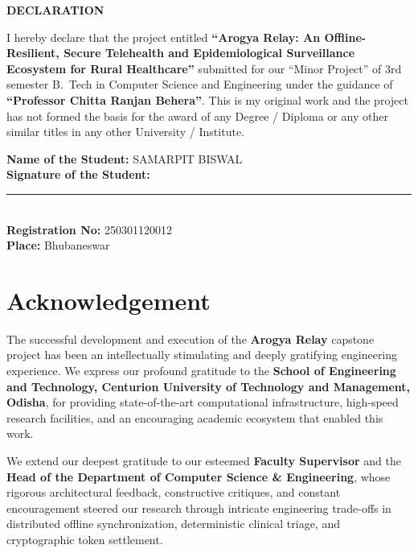 \documentclass[12pt,a4paper,oneside]{report}
\begin{document}
\clearpage

\thispagestyle{plain}

\begin{center}
    {\fontsize{16}{20}\selectfont \bfseries DECLARATION}
\end{center}
\vspace{1.0cm}

{\fontsize{13}{20}\selectfont
\noindent I hereby declare that the project entitled \textbf{``Arogya Relay: An Offline-Resilient, Secure Telehealth and Epidemiological Surveillance Ecosystem for Rural Healthcare''} submitted for our ``Minor Project'' of 3rd semester B.~Tech in Computer Science and Engineering under the guidance of \textbf{``Professor Chitta Ranjan Behera''}. This is my original work and the project has not formed the basis for the award of any Degree / Diploma or any other similar titles in any other University / Institute.
}

\vspace{3.5cm}

\noindent
{\fontsize{13}{22}\selectfont
\textbf{Name of the Student:} SAMARPIT BISWAL \\[0.4cm]
\textbf{Signature of the Student:} \rule{5.5cm}{0.4pt} \\[0.4cm]
\textbf{Registration No:} 250301120012 \\[0.4cm]
\textbf{Place:} Bhubaneswar
}

\clearpage
\chapter*{Acknowledgement}

The successful development and execution of the \textbf{Arogya Relay} capstone project has been an intellectually stimulating and deeply gratifying engineering experience. We express our profound gratitude to the \textbf{School of Engineering and Technology, Centurion University of Technology and Management, Odisha}, for providing state-of-the-art computational infrastructure, high-speed research facilities, and an encouraging academic ecosystem that enabled this work.

\vspace{0.4cm}
We extend our deepest gratitude to our esteemed \textbf{Faculty Supervisor} and the \textbf{Head of the Department of Computer Science \& Engineering}, whose rigorous architectural feedback, constructive critiques, and constant encouragement steered our research through intricate engineering trade-offs in distributed offline synchronization, deterministic clinical triage, and cryptographic token settlement.
\end{document}
